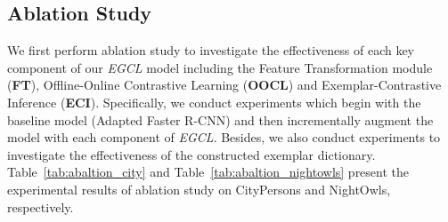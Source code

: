 \documentclass[journal]{IEEEtran}
\begin{document}
\subsection{Ablation Study} 
\label{sec:ablation}
We first perform ablation study to investigate the effectiveness of each key component of our \emph{EGCL} model including the Feature Transformation module (\textbf{FT}), Offline-Online Contrastive Learning (\textbf{OOCL}) and Exemplar-Contrastive Inference (\textbf{ECI}). Specifically, we conduct experiments which begin with the baseline model (Adapted Faster R-CNN) and then incrementally augment the model with each component of \emph{EGCL}. Besides, we also conduct experiments to investigate the effectiveness of the constructed exemplar dictionary. Table~\ref{tab:abaltion_city} and Table~\ref{tab:abaltion_nightowls} present the experimental results of ablation study on CityPersons and NightOwls, respectively. 

\begin{table}[!t]
\centering
\caption{Ablation study of our \emph{EGCL} model on CityPersons validation set in terms of $MR^{-2}$ (lower is better). Baseline refers to Adapted Faster R-CNN. Note that the FT module is embedded before the RPN module in the Asterisked model (Baseline+FT$^*$) while other models mount the FT module after the RPN. For all results, lower is better.}
\renewcommand\arraystretch{2.8} 
\label{tab:abaltion_city}
\end{table}
\end{document}
